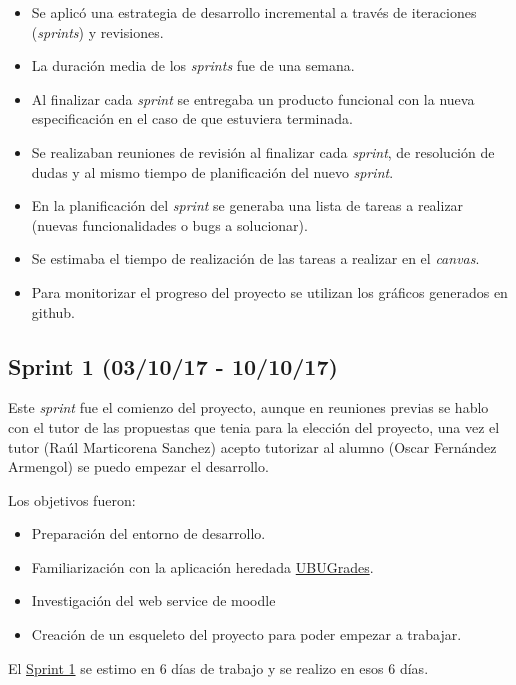 \begin{itemize}
	\tightlist
	\item
	Se aplicó una estrategia de desarrollo incremental a través de
	iteraciones (\emph{sprints}) y revisiones.
	\item
	La duración media de los \emph{sprints} fue de una semana.
	\item
	Al finalizar cada \emph{sprint} se entregaba un producto funcional con la nueva especificación en el caso de que estuviera terminada.
	\item
	Se realizaban reuniones de revisión al finalizar cada \emph{sprint}, de resolución de dudas y
	al mismo tiempo de planificación del nuevo \emph{sprint}.
	\item
	En la planificación del \emph{sprint} se generaba una lista de tareas a realizar (nuevas funcionalidades o bugs a solucionar).
	\item
	Se estimaba el tiempo de realización de las tareas a realizar en el \emph{canvas}.
	\item
	Para monitorizar el progreso del proyecto se utilizan los gráficos generados en github.
	
\end{itemize}

\subsection{Sprint 1 (03/10/17 -
	10/10/17)}\label{sprint-1-0031017---101017}
Este \emph{sprint} fue el comienzo del proyecto, aunque en reuniones previas se hablo con el tutor de las propuestas que tenia para la elección del proyecto, una vez el tutor (Raúl Marticorena Sanchez) acepto tutorizar al alumno (Oscar Fernández Armengol) se puedo empezar el desarrollo.

Los objetivos fueron:
\begin{itemize}
	\tightlist
	\item
	Preparación del entorno de desarrollo.
	\item
	Familiarización con la aplicación heredada \href{https://github.com/claumartinezh/TFG_UBUGrades}{UBUGrades}.
	\item
	Investigación del web service de moodle
	\item
	Creación de un esqueleto del proyecto para poder empezar a trabajar.
	
\end{itemize}
El \href{https://github.com/trona85/GII-17.1B-UBULog-1.0/milestone/1?closed=1}{Sprint 1} se estimo en 6 días de trabajo y se realizo en esos 6 días.

